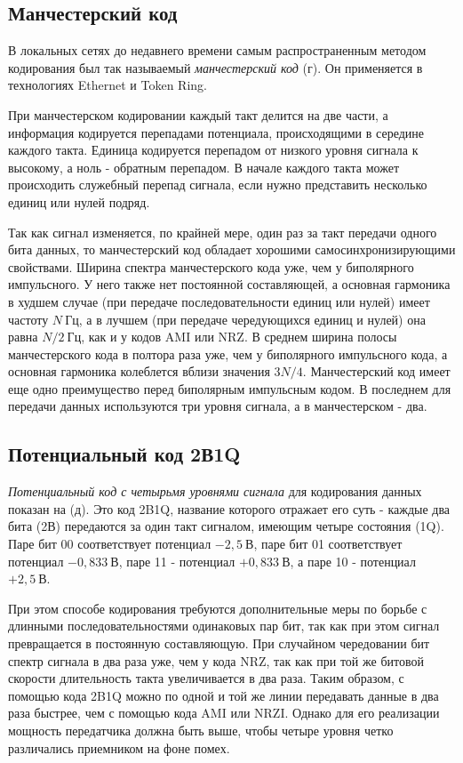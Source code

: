 \subsection{Манчестерский код}

В локальных сетях до недавнего времени самым распространенным методом кодирования был так называемый \emph{манчестерский код} (г).
Он применяется в технологиях Ethernet и Token Ring.

При манчестерском кодировании каждый такт делится на две части, а информация кодируется перепадами потенциала, происходящими в середине каждого такта.
Единица кодируется перепадом от низкого уровня сигнала к  высокому, а ноль - обратным перепадом.
В начале каждого такта может происходить служебный перепад сигнала, если нужно представить несколько единиц или нулей подряд.

Так как сигнал изменяется, по крайней мере, один раз за такт передачи одного бита данных, то манчестерский код обладает хорошими самосинхронизирующими свойствами.
Ширина спектра манчестерского кода уже, чем у биполярного импульсного.
У него также нет постоянной составляющей, а основная гармоника в худшем случае (при передаче последовательности единиц или нулей) имеет частоту $N~Гц$, а в лучшем (при передаче чередующихся единиц и нулей) она равна $N / 2~Гц$, как и у кодов AMI или NRZ.
В среднем ширина полосы манчестерского кода в полтора раза уже, чем у биполярного импульсного кода, а основная гармоника колеблется вблизи значения $3N / 4$.
Манчестерский код имеет еще одно преимущество перед биполярным импульсным кодом.
В последнем для передачи данных используются три уровня сигнала, а в манчестерском - два.

\subsection{Потенциальный код 2В1Q}

\emph{Потенциальный код с четырьмя уровнями сигнала} для кодирования данных показан на (д).
Это код 2B1Q, название которого отражает его суть - каждые два бита (2В) передаются за один такт сигналом, имеющим четыре состояния (1Q).
Паре бит 00 соответствует потенциал $-2,5~В$, паре  бит 01  соответствует  потенциал $-0,833~В$, паре 11 - потенциал $+0,833~В$, а паре 10 - потенциал $+2,5~В$.

При этом способе кодирования требуются дополнительные меры по борьбе с длинными последовательностями одинаковых пар бит, так как при этом сигнал превращается в постоянную составляющую.
При случайном чередовании бит спектр сигнала в два раза уже, чем у кода NRZ, так как при той же битовой скорости длительность такта увеличивается в два раза.
Таким образом, с помощью кода 2B1Q можно по одной и той же линии передавать данные в два раза быстрее, чем с помощью кода AMI или NRZI.
Однако для его реализации мощность передатчика должна быть выше, чтобы четыре уровня четко различались приемником на фоне помех.

